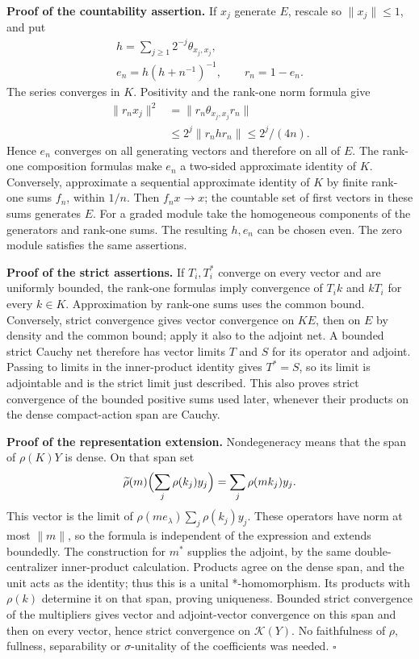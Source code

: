 \documentclass[
  11pt,
]{article}
\begin{document}
\textbf{Proof of the countability assertion.} If \(x_j\) generate \(E\),
rescale so \(\|x_j\|\leq1\), and put \[
\begin{gathered}
h=\sum_{j\geq1}2^{-j}\theta_{x_j,x_j},\\
e_n=h(h+n^{-1})^{-1},\qquad r_n=1-e_n.
\end{gathered}
\] The series converges in \(K\). Positivity and the rank-one norm
formula give \[
\begin{aligned}
\|r_nx_j\|^2
&=\|r_n\theta_{x_j,x_j}r_n\|\\
&\leq2^j\|r_nhr_n\|\leq2^j/(4n).
\end{aligned}
\] Hence \(e_n\) converges on all generating vectors and therefore on
all of \(E\). The rank-one composition formulas make \(e_n\) a two-sided
approximate identity of \(K\). Conversely, approximate a sequential
approximate identity of \(K\) by finite rank-one sums \(f_n\), within
\(1/n\). Then \(f_nx\to x\); the countable set of first vectors in these
sums generates \(E\). For a graded module take the homogeneous
components of the generators and rank-one sums. The resulting \(h,e_n\)
can be chosen even. The zero module satisfies the same assertions.

\textbf{Proof of the strict assertions.} If \(T_i,T_i^*\) converge on
every vector and are uniformly bounded, the rank-one formulas imply
convergence of \(T_ik\) and \(kT_i\) for every \(k\in K\). Approximation
by rank-one sums uses the common bound. Conversely, strict convergence
gives vector convergence on \(KE\), then on \(E\) by density and the
common bound; apply it also to the adjoint net. A bounded strict Cauchy
net therefore has vector limits \(T\) and \(S\) for its operator and
adjoint. Passing to limits in the inner-product identity gives
\(T^*=S\), so its limit is adjointable and is the strict limit just
described. This also proves strict convergence of the bounded positive
sums used later, whenever their products on the dense compact-action
span are Cauchy.

\textbf{Proof of the representation extension.} Nondegeneracy means that
the span of \(\rho(K)Y\) is dense. On that span set \[
\widetilde\rho(m)\Bigl(\sum_j\rho(k_j)y_j\Bigr)
=\sum_j\rho(mk_j)y_j.
\] This vector is the limit of \(\rho(me_\lambda)\sum_j\rho(k_j)y_j\).
These operators have norm at most \(\|m\|\), so the formula is
independent of the expression and extends boundedly. The construction
for \(m^*\) supplies the adjoint, by the same double-centralizer
inner-product calculation. Products agree on the dense span, and the
unit acts as the identity; thus this is a unital *-homomorphism. Its
products with \(\rho(k)\) determine it on that span, proving uniqueness.
Bounded strict convergence of the multipliers gives vector and
adjoint-vector convergence on this span and then on every vector, hence
strict convergence on \(\mathcal K(Y)\). No faithfulness of \(\rho\),
fullness, separability or \(\sigma\)-unitality of the coefficients was
needed. \(\square\)
\end{document}

